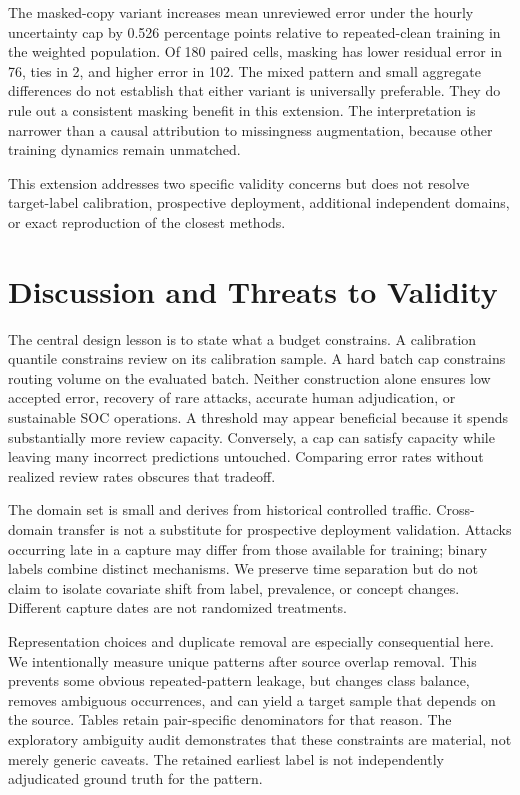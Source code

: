 \documentclass[manuscript,screen,nonacm]{acmart}
\begin{document}
The masked-copy variant increases mean unreviewed error under the hourly uncertainty cap by 0.526 percentage points relative to repeated-clean training in the weighted population. Of 180 paired cells, masking has lower residual error in 76, ties in 2, and higher error in 102. The mixed pattern and small aggregate differences do not establish that either variant is universally preferable. They do rule out a consistent masking benefit in this extension. The interpretation is narrower than a causal attribution to missingness augmentation, because other training dynamics remain unmatched.

This extension addresses two specific validity concerns but does not resolve target-label calibration, prospective deployment, additional independent domains, or exact reproduction of the closest methods.

\section{Discussion and Threats to Validity}
The central design lesson is to state what a budget constrains. A calibration quantile constrains review on its calibration sample. A hard batch cap constrains routing volume on the evaluated batch. Neither construction alone ensures low accepted error, recovery of rare attacks, accurate human adjudication, or sustainable SOC operations. A threshold may appear beneficial because it spends substantially more review capacity. Conversely, a cap can satisfy capacity while leaving many incorrect predictions untouched. Comparing error rates without realized review rates obscures that tradeoff.

The domain set is small and derives from historical controlled traffic. Cross-domain transfer is not a substitute for prospective deployment validation. Attacks occurring late in a capture may differ from those available for training; binary labels combine distinct mechanisms. We preserve time separation but do not claim to isolate covariate shift from label, prevalence, or concept changes. Different capture dates are not randomized treatments.

Representation choices and duplicate removal are especially consequential here. We intentionally measure unique patterns after source overlap removal. This prevents some obvious repeated-pattern leakage, but changes class balance, removes ambiguous occurrences, and can yield a target sample that depends on the source. Tables retain pair-specific denominators for that reason. The exploratory ambiguity audit demonstrates that these constraints are material, not merely generic caveats. The retained earliest label is not independently adjudicated ground truth for the pattern.
\end{document}
